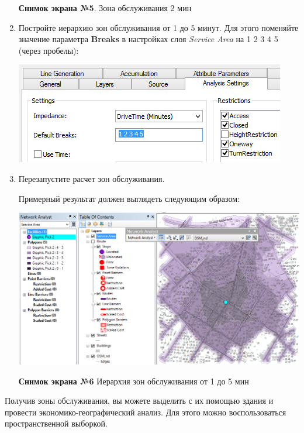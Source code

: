 \documentclass[]{book}
\theoremstyle{definition}
\theoremstyle{definition}
\theoremstyle{definition}
\theoremstyle{remark}
\begin{document}
\begin{enumerate}
  \textbf{Снимок экрана №5}. Зона обслуживания 2 мин
\item
  Постройте иерархию зон обслуживания от 1 до 5 минут. Для этого
  поменяйте значение параметра \textbf{Breaks} в настройках слоя
  \emph{Service Area} на 1 2 3 4 5 (через пробелы):

  \includegraphics{images/Ex12/image16.png}
\item
  Перезапустите расчет зон обслуживания.

  Примерный результат должен выглядеть следующим образом:

  \includegraphics{images/Ex12/image17.png}

  \textbf{Снимок экрана №6} Иерархия зон обслуживания от 1 до 5 мин
\end{enumerate}

Получив зоны обслуживания, вы можете выделить с их помощью здания и
провести экономико-географический анализ. Для этого можно
воспользоваться пространственной выборкой.
\end{document}
